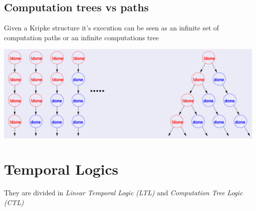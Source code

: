 \documentclass{article}
\begin{document}
\subsection{Computation trees vs paths}
Given a Kripke structure it's execution can be seen as an infinite set of computation paths or an infinite computations tree
\begin{center}
    \includegraphics[width=0.8\linewidth]{images/pathVsTree.png}
\end{center}

\section{Temporal Logics}
They are divided in \textit{Linear Temporal Logic (LTL)} and \textit{Computation Tree Logic (CTL)}
\end{document}
